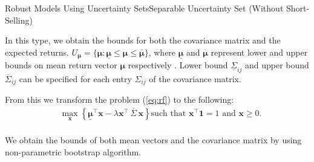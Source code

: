 \documentclass{beamer}
\begin{document}
\begin{frame}{Robust Models Using Uncertainty Sets}{Separable Uncertainty Set (Without Short-Selling)}

In this type, we obtain the bounds for both the covariance matrix and the expected returns.
$U_{\boldsymbol{\mu}}= \{\boldsymbol{\mu}: \underline{\boldsymbol{\mu}} \leq \boldsymbol{\mu} \leq \overline{\boldsymbol{\mu}} \}$, where $\underline{\boldsymbol{\mu}}$ and $\overline{\boldsymbol{\mu}}$ represent lower and upper bounds on mean return vector $\boldsymbol{\mu}$ respectively .
Lower bound $\underline{\Sigma}_{ij}$ and upper bound $\overline{\Sigma}_{ij}$ can be specified for each entry $\Sigma_{ij}$ of the covariance matrix.

From this we transform the problem (\ref{eq:rf}) to the following:
\begin{equation}
\begin{split}
& \max_{\mathbf{x}} \left\{ \underline{\boldsymbol{\mu}}^{\top} \mathbf{x} - \lambda \mathbf{x^{\top}} \, \overline{\Sigma} \, \mathbf{x} \right\} \text{such that } \mathbf{x^{\top}} \mathbf{1}  = 1 \text{ and } \mathbf{x} \geq 0.  \\
\end{split}
\end{equation}

\vfill
We obtain the bounds of both mean vectors and the covariance matrix by using non-parametric bootstrap algorithm.


\end{frame}

\end{document}
